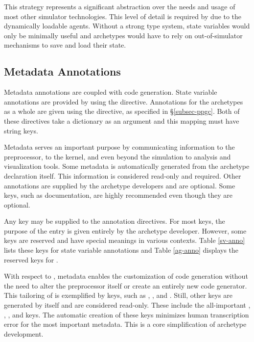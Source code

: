 This strategy represents a significant abstraction over the needs and usage of most 
other simulator technologies. This level of detail is required by \cyclus due to the
dynamically loadable agents. Without a strong type system, state variables 
would only be minimally useful and archetypes would have to rely on out-of-simulator
mechanisms to save and load their state.

\subsection{Metadata Annotations}

Metadata annotations are coupled with code generation.  State variable annotations
are provided by using the  directive. Annotations for 
the archetypes as a whole are given using the  directive,
as specified in \S \ref{subsec-ppgc}. Both of these directives take a dictionary 
as an argument and this mapping must have string keys.

Metadata serves an important purpose by communicating information to the \cyclus
preprocessor, to the \cyclus kernel, and even beyond the simulation to analysis 
and visualization tools. Some metadata is automatically generated from the 
archetype declaration itself.  This information is considered read-only and required. 
Other annotations are supplied by the archetype developers and are optional. 
Some keys, such as documentation, are highly recommended even though they 
are optional.

Any key may be supplied to the annotation directives. For most keys, the 
purpose of the entry is given entirely by the archetype developer. However, 
some keys are reserved and have special meanings in various contexts. Table
\ref{sv-anno} lists these keys for state variable annotations and Table
\ref{ag-anno} displays the reserved keys for .

With respect to \cycpp, metadata enables the customization of code generation
without the need to alter the preprocessor itself or create an entirely new 
code generator. This tailoring of \cycpp is exemplified by keys, such as , 
, and .  Still, other keys are generated by \cycpp itself
and are considered read-only.
These include the all-important , , , and 
 keys.  The automatic
creation of these keys minimizes human transcription error for the most important 
metadata. This is a core simplification of archetype development.

